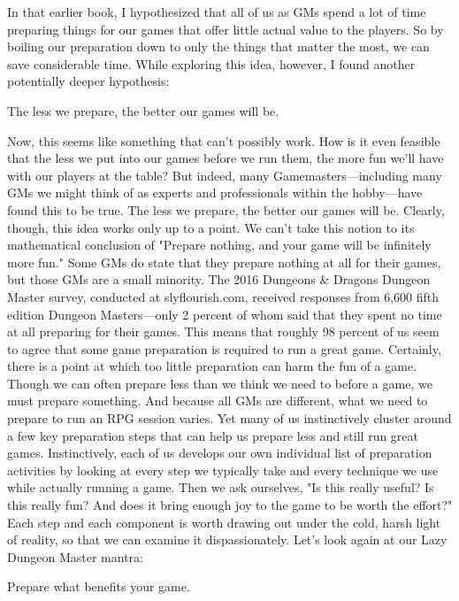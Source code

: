 \documentclass[10pt,a4paper,twoside,bg=print,twocolumn,openany,nodeprecatedcode]{dndbook}
\begin{document}
In that earlier book, I hypothesized that all of us as GMs spend a lot of time preparing things for our games that offer little actual value to the players. So by boiling our preparation down to only the things that matter the most, we can save considerable time.
While exploring this idea, however, I found another potentially deeper hypothesis:
\begin{DndSidebar}[float=!b]{}
The less we prepare, the better our games will be.


\end{DndSidebar}

Now, this seems like something that can't possibly work. How is it even feasible that the less we put into our games before we run them, the more fun we'll have with our players at the table? But indeed, many Gamemasters—including many GMs we might think of as experts and professionals within the hobby—have found this to be true. The less we prepare, the better our games will be.
Clearly, though, this idea works only up to a point. We can't take this notion to its mathematical conclusion of "Prepare nothing, and your game will be infinitely more fun." Some GMs do state that they prepare nothing at all for their games, but those GMs are a small minority. The 2016 Dungeons \& Dragons Dungeon Master survey, conducted at slyflourish.com, received responses from 6,600 fifth edition Dungeon Masters—only 2 percent of whom said that they spent no time at all preparing for their games. This means that roughly 98 percent of us seem to agree that some game preparation is required to run a great game.
Certainly, there is a point at which too little preparation can harm the fun of a game. Though we can often prepare less than we think we need to before a game, we must prepare something. And because all GMs are different, what we need to prepare to run an RPG session varies. Yet many of us instinctively cluster around a few key preparation steps that can help us prepare less and still run great games.
Instinctively, each of us develops our own individual list of preparation activities by looking at every step we typically take and every technique we use while actually running a game. Then we ask ourselves, "Is this really useful? Is this really fun? And does it bring enough joy to the game to be worth the effort?" Each step and each component is worth drawing out under the cold, harsh light of reality, so that we can examine it dispassionately.
Let's look again at our Lazy Dungeon Master mantra:
\begin{DndSidebar}[float=!b]{}
Prepare what benefits your game.


\end{DndSidebar}
\end{document}
